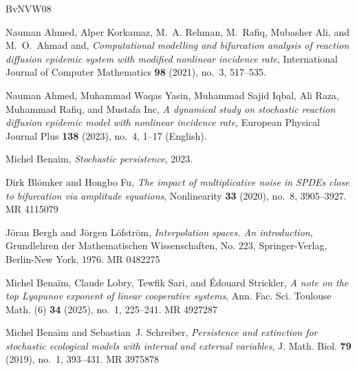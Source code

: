 \documentclass[final]{amsart}
\numberwithin{thm}{section}
\numberwithin{equation}{section}
\begin{document}

\newcommand{\etalchar}[1]{$^{#1}$}
\providecommand{\bysame}{\leavevmode\hbox to3em{\hrulefill}\thinspace}
\providecommand{\MR}{\relax\ifhmode\unskip\space\fi MR }
\providecommand{\MRhref}[2]{%
  \href{http://www.ams.org/mathscinet-getitem?mr=#1}{#2}
}
\providecommand{\href}[2]{#2}
\begin{thebibliography}{BvNVW08}

\bibitem[AKR{\etalchar{+}}21]{deterministic-SIR}
Nauman Ahmed, Alper Korkamaz, M.~A. Rehman, M.~Rafiq, Mubasher Ali, and
  M.~O.~Ahmad and, \emph{Computational modelling and bifurcation analysis of
  reaction diffusion epidemic system with modified nonlinear incidence rate},
  International Journal of Computer Mathematics \textbf{98} (2021), no.~3,
  517--535.

\bibitem[AYI{\etalchar{+}}23]{stochastic-SIR}
Nauman Ahmed, {Muhammad Waqas} Yasin, {Muhammad Sajid} Iqbal, Ali Raza,
  Muhammad Rafiq, and Mustafa Inc, \emph{A dynamical study on stochastic
  reaction diffusion epidemic model with nonlinear incidence rate}, European
  Physical Journal Plus \textbf{138} (2023), no.~4, 1--17 (English).

Michel Benaim, \emph{Stochastic persistence}, 2023.

Dirk Bl\"omker and Hongbo Fu, \emph{The impact of multiplicative noise in
  {SPDE}s close to bifurcation via amplitude equations}, Nonlinearity
  \textbf{33} (2020), no.~8, 3905--3927. \MR{4115079}

J\"{o}ran Bergh and J\"{o}rgen L\"{o}fstr\"{o}m, \emph{Interpolation spaces.
  {A}n introduction}, Grundlehren der Mathematischen Wissenschaften, No. 223,
  Springer-Verlag, Berlin-New York, 1976. \MR{0482275}

Michel Bena\"im, Claude Lobry, Tewfik Sari, and \'Edouard Strickler, \emph{A
  note on the top {L}yapunov exponent of linear cooperative systems}, Ann. Fac.
  Sci. Toulouse Math. (6) \textbf{34} (2025), no.~1, 225--241. \MR{4927287}

Michel Bena\"{\i}m and Sebastian~J. Schreiber, \emph{Persistence and extinction
  for stochastic ecological models with internal and external variables}, J.
  Math. Biol. \textbf{79} (2019), no.~1, 393--431. \MR{3975878}


\end{thebibliography}
\end{document}
